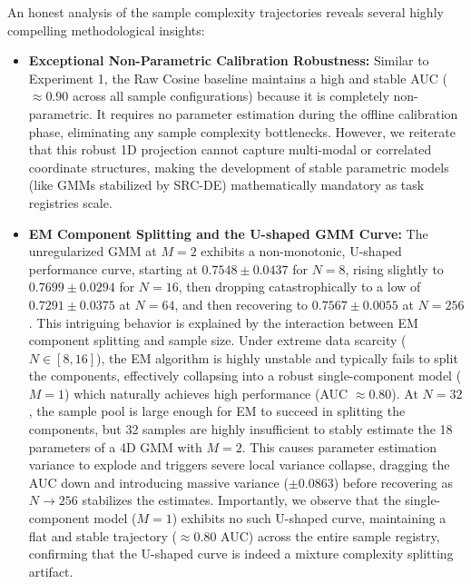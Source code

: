 An honest analysis of the sample complexity trajectories reveals several highly compelling methodological insights:
\begin{itemize}
    \item {\bf Exceptional Non-Parametric Calibration Robustness:} Similar to Experiment 1, the Raw Cosine baseline maintains a high and stable AUC ($\approx 0.90$ across all sample configurations) because it is completely non-parametric. It requires no parameter estimation during the offline calibration phase, eliminating any sample complexity bottlenecks. However, we reiterate that this robust 1D projection cannot capture multi-modal or correlated coordinate structures, making the development of stable parametric models (like GMMs stabilized by SRC-DE) mathematically mandatory as task registries scale.
    \item {\bf EM Component Splitting and the U-shaped GMM Curve:} The unregularized GMM at $M=2$ exhibits a non-monotonic, U-shaped performance curve, starting at $0.7548 \pm 0.0437$ for $N=8$, rising slightly to $0.7699 \pm 0.0294$ for $N=16$, then dropping catastrophically to a low of $0.7291 \pm 0.0375$ at $N=64$, and then recovering to $0.7567 \pm 0.0055$ at $N=256$. This intriguing behavior is explained by the interaction between EM component splitting and sample size. Under extreme data scarcity ($N \in [8, 16]$), the EM algorithm is highly unstable and typically fails to split the components, effectively collapsing into a robust single-component model ($M=1$) which naturally achieves high performance (AUC $\approx 0.80$). At $N=32$, the sample pool is large enough for EM to succeed in splitting the components, but 32 samples are highly insufficient to stably estimate the 18 parameters of a 4D GMM with $M=2$. This causes parameter estimation variance to explode and triggers severe local variance collapse, dragging the AUC down and introducing massive variance ($\pm 0.0863$) before recovering as $N \to 256$ stabilizes the estimates. Importantly, we observe that the single-component model ($M=1$) exhibits no such U-shaped curve, maintaining a flat and stable trajectory ($\approx 0.80$ AUC) across the entire sample registry, confirming that the U-shaped curve is indeed a mixture complexity splitting artifact.

\end{itemize}
